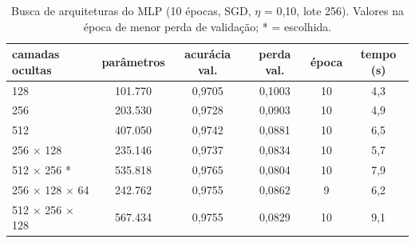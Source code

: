 \begin{table}[!t]
\centering
\caption{Busca de arquiteturas do MLP (10 épocas, SGD, $\eta$ = 0,10, lote 256). Valores na época de menor perda de validação; * = escolhida.}
\label{tab:busca}
\begin{tabular}{lccccc}
\hline
camadas ocultas & parâmetros & acurácia val. & perda val. & época & tempo (s) \\
\hline
128 & 101.770 & 0,9705 & 0,1003 & 10 & 4,3 \\
256 & 203.530 & 0,9728 & 0,0903 & 10 & 4,9 \\
512 & 407.050 & 0,9742 & 0,0881 & 10 & 6,5 \\
256 $\times$ 128 & 235.146 & 0,9737 & 0,0834 & 10 & 5,7 \\
512 $\times$ 256 * & 535.818 & 0,9765 & 0,0804 & 10 & 7,9 \\
256 $\times$ 128 $\times$ 64 & 242.762 & 0,9755 & 0,0862 & 9 & 6,2 \\
512 $\times$ 256 $\times$ 128 & 567.434 & 0,9755 & 0,0829 & 10 & 9,1 \\
\hline
\end{tabular}
\end{table}